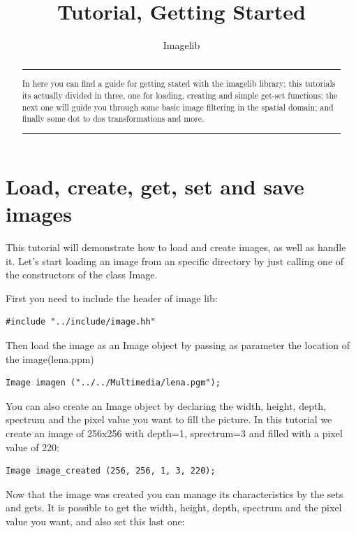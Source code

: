\documentclass[a4paper]{article}
\title{Tutorial, Getting Started}
\author{Imagelib}
\begin{document}
\maketitle

\begin{abstract}


\hrule
\vspace{0.5cm}
In here you can find a guide for getting stated with the imagelib library; this tutorials its actually divided in three, one for loading, creating and simple get-set functions; the next one will guide you through some basic image filtering in the spatial domain; and finally some dot to dos transformations and more.
\vspace{0.5cm}
\hrule
\end{abstract}

\section{Load, create, get, set and save images}

This tutorial will demonstrate how to load and create images, as well as handle it. Let's start loading an image from an specific directory by just calling one of the constructors of the class Image.

First you need to include the header of image lib:

\begin{lstlisting}
#include "../include/image.hh"
\end{lstlisting}

Then load the image as an Image object by passing as parameter the  location of the image(lena.ppm)

\begin{lstlisting}
Image imagen ("../../Multimedia/lena.pgm");
\end{lstlisting}

You can also create an Image object by declaring the width, height, depth, spectrum and the pixel value you want to fill the picture. In this tutorial we create an image of 256x256 with depth=1, sprectrum=3 and filled with a pixel value of 220:

\begin{lstlisting}
Image image_created (256, 256, 1, 3, 220);
\end{lstlisting}


Now that the image was created you can manage its characteristics by the sets and gets.  It is possible to get the width, height, depth, spectrum and the pixel value you want, and also set this last one:
\end{document}
